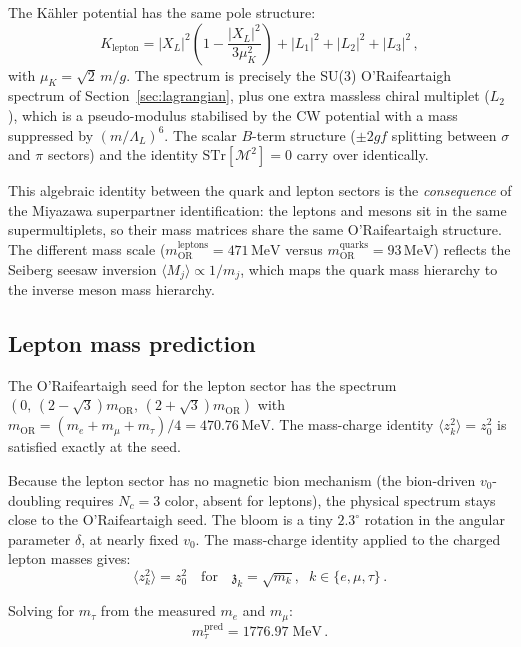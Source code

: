 \documentclass[12pt,a4paper]{article}
\newcommand{\MeV}{\,\text{MeV}}
\newcommand{\zch}{\mathfrak{z}}
\begin{document}
The K\"ahler potential has the same pole structure:
\begin{equation}
K_{\text{lepton}} = |X_L|^2\!\left(1 - \frac{|X_L|^2}{3\mu_K^2}\right)
  + |L_1|^2 + |L_2|^2 + |L_3|^2\,,
\end{equation}
with $\mu_K = \sqrt{2}\,m/g$.
The spectrum is precisely the SU(3) O'Raifeartaigh spectrum of
Section~\ref{sec:lagrangian}, plus one extra massless
chiral multiplet ($L_2$), which is a pseudo-modulus stabilised by the
CW potential with a mass suppressed by $(m/\Lambda_L)^6$.
The scalar $B$-term structure ($\pm 2gf$ splitting between
$\sigma$ and $\pi$ sectors) and the identity
$\mathrm{STr}[\mathcal{M}^2] = 0$ carry over identically.

This algebraic identity between the quark and lepton sectors
is the \emph{consequence} of the Miyazawa superpartner
identification: the leptons and mesons sit in the same
supermultiplets, so their mass matrices share the same
O'Raifeartaigh structure. The different mass scale
($m_{\text{OR}}^{\text{leptons}} = 471\MeV$ versus
$m_{\text{OR}}^{\text{quarks}} = 93\MeV$) reflects the
Seiberg seesaw inversion $\langle M_j\rangle \propto 1/m_j$,
which maps the quark mass hierarchy to the inverse meson
mass hierarchy.

\subsection{Lepton mass prediction}

The O'Raifeartaigh seed for the lepton sector has the spectrum
$(0,\, (2-\sqrt{3})m_{\text{OR}},\, (2+\sqrt{3})m_{\text{OR}})$
with $m_{\text{OR}} = (m_e + m_\mu + m_\tau)/4 = 470.76\MeV$.
The mass-charge identity $\langle z_k^2\rangle = z_0^2$ is satisfied exactly at the seed.

Because the lepton sector has no magnetic bion mechanism (the
bion-driven $v_0$-doubling requires $N_c = 3$ color, absent for
leptons), the physical spectrum stays close to the
O'Raifeartaigh seed. The bloom is a tiny $2.3^\circ$ rotation in
the angular parameter $\delta$, at nearly fixed $v_0$. The
mass-charge identity applied to the charged lepton masses gives:
\begin{equation}
\langle z_k^2 \rangle = z_0^2
\quad\text{for}\quad
\zch_k = \sqrt{m_k},\;\; k \in \{e, \mu, \tau\}\,.
\end{equation}

Solving for $m_\tau$ from the measured $m_e$ and $m_\mu$:
\begin{equation}
m_\tau^{\mathrm{pred}} = 1776.97\;\mathrm{MeV}\,.
\end{equation}
\end{document}
